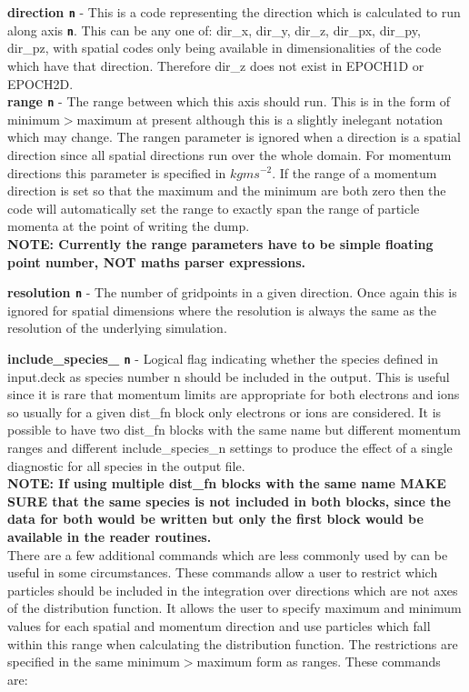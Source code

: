 \documentclass[12pt]{article}
\newcommand{\emphtext}{\color{warwickdark} \fontfamily{phv}\selectfont\Large\bf}
\newcommand{\inlinecode}[1]{{\color{warwickred} \bf\texttt{#1}}}
\begin{document}
{\emphtext direction\inlinecode{n}} - This is a code representing the direction
which is calculated to run along axis \inlinecode{n}. This can be any one of:
dir\_x, dir\_y, dir\_z, dir\_px, dir\_py, dir\_pz, with spatial codes only
being available in dimensionalities of the code which have that
direction. Therefore dir\_z does not exist in EPOCH1D or EPOCH2D.\\

{\emphtext range\inlinecode{n}} - The range between which this axis should
run. This is in the form of minimum$>$maximum at present although this is a
slightly inelegant notation which may change. The rangen parameter is ignored
when a direction is a spatial direction since all spatial directions run over
the whole domain. For momentum directions this parameter is specified in
$kgms^{-2}$. If the range of a momentum direction is set so that the maximum
and the minimum are both zero then the code will automatically set the range to
exactly span the range of particle momenta at the point of writing the dump.\\

{\emphtext NOTE: Currently the range parameters have to be simple floating
point number, NOT maths parser expressions.}

{\emphtext resolution\inlinecode{n}} - The number of gridpoints in a given
direction. Once again this is ignored for spatial dimensions where the
resolution is always the same as the resolution of the underlying simulation.

{\emphtext include\_species\_\inlinecode{n}} - Logical flag indicating whether
the species defined in input.deck as species number n should be included in the
output. This is useful since it is rare that momentum limits are appropriate
for both electrons and ions so usually for a given dist\_fn block only
electrons or ions are considered. It is possible to have two dist\_fn blocks
with the same name but different momentum ranges and different
include\_species\_n settings to produce the effect of a single diagnostic for
all species in the output file.\\

{\emphtext NOTE: If using multiple dist\_fn blocks with the same name MAKE SURE
that the same species is not included in both blocks, since the data for both
would be written but only the first block would be available in the reader
routines.}\\

There are a few additional commands which are less commonly used by can be
useful in some circumstances. These commands allow a user to restrict which
particles should be included in the integration over directions which are not
axes of the distribution function. It allows the user to specify maximum and
minimum values for each spatial and momentum direction and use particles which
fall within this range when calculating the distribution function. The
restrictions are specified in the same minimum$>$maximum form as ranges. These
commands are:\\
\end{document}

